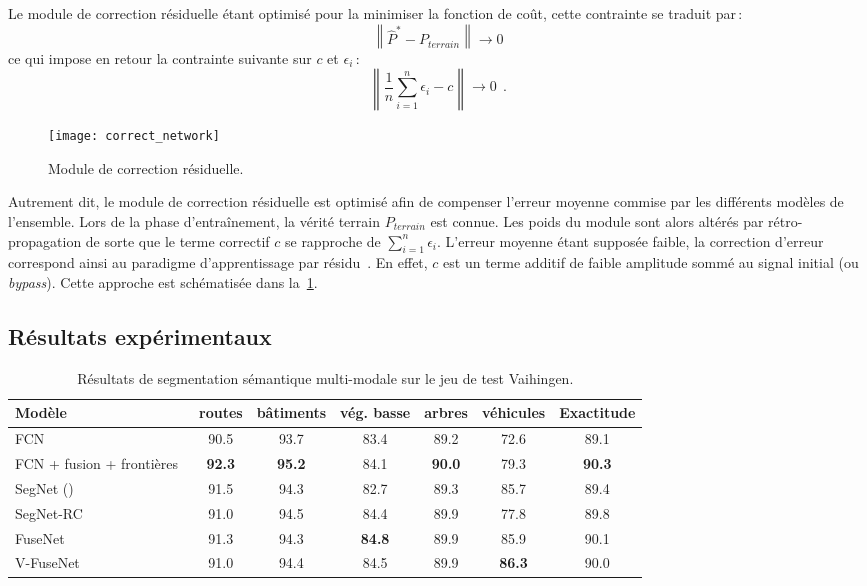 Le module de correction résiduelle étant optimisé pour la minimiser la fonction de coût, cette contrainte se traduit par\,:
\begin{equation}
\left\lVert \hat{P}^* - P_\mathit{terrain} \right\rVert \rightarrow 0
\end{equation}
ce qui impose en retour la contrainte suivante sur $c$ et $\epsilon_i$\,:
\begin{equation}
\left\lVert \frac{1}{n} \sum_{i=1}^n \epsilon_i - c \right\rVert \rightarrow 0~~.
\end{equation}

\begin{figure}[t]
  \centering
  \texttt{[image: correct\_network]}
  \caption{Module de correction résiduelle.}
  \label{fig:correction_network}
\end{figure}

Autrement dit, le module de correction résiduelle est optimisé afin de compenser l'erreur moyenne commise par les différents modèles de l'ensemble. Lors de la phase d'entraînement, la vérité terrain $P_\mathit{terrain}$ est connue. Les poids du module sont alors altérés par rétro-propagation de sorte que le terme correctif $c$ se rapproche de $\sum_{i=1}^n \epsilon_i$. L'erreur moyenne étant supposée faible, la correction d'erreur correspond ainsi au paradigme d'apprentissage par résidu~\cite{he_deep_2016}. En effet, $c$ est un terme additif de faible amplitude sommé au signal initial (ou \emph{bypass}). Cette approche est schématisée dans la~\cref{fig:correction_network}.

\subsection{Résultats expérimentaux}


\begin{table}
    \caption{Résultats de segmentation sémantique multi-modale sur le jeu de test  Vaihingen.}
    \label{table:final_vaihingen}
    \setlength\tabcolsep{5pt}
	\begin{tabularx}{\textwidth}{Y c c c c c c}
    \toprule
	  Modèle & routes & bâtiments & vég. basse & arbres & véhicules & Exactitude\\
    \midrule
    FCN~\cite{sherrah_fully_2016} & 90.5 & 93.7 & 83.4 & 89.2 & 72.6 & 89.1\\
    FCN + fusion + frontières~\cite{marmanis_classification_2017} & \textbf{92.3} & \textbf{95.2} & 84.1 & \textbf{90.0} & 79.3 & \textbf{90.3}\\
    \midrule
    SegNet () & 91.5 & 94.3 & 82.7 & 89.3 & 85.7 & 89.4\\
	  SegNet-RC & 91.0 & 94.5 & 84.4 & 89.9 & 77.8 & 89.8\\
    FuseNet & 91.3 & 94.3 & \textbf{84.8} & 89.9 & 85.9 & 90.1\\
    V-FuseNet & 91.0 & 94.4 & 84.5 & 89.9 & \textbf{86.3} & 90.0\\
    \bottomrule
    \end{tabularx}
\end{table}

